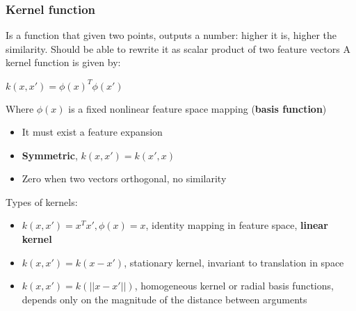 \subsubsection{Kernel function}
    Is a function that given two points, outputs a number: higher it is, higher the similarity. Should be able to rewrite it as scalar product of two feature vectors
    A kernel function is given by:
    \begin{center}
        $k(x,x')=\phi(x)^T\phi(x')$        
    \end{center}
    Where $\phi(x)$ is a fixed nonlinear feature space mapping (\textbf{basis function})
    \begin{itemize}
        \item It must exist a feature expansion
        \item \textbf{Symmetric}, $k(x,x')=k(x',x)$
        \item Zero when two vectors orthogonal, no similarity
    \end{itemize}
    Types of kernels:
    \begin{itemize}
        \item $k(x,x')=x^Tx', \phi(x)=x$, identity mapping in feature space, \textbf{linear kernel}
        \item $k(x,x')=k(x-x')$, stationary kernel, invariant to translation in space
        \item $k(x,x')=k(||x-x'||)$, homogeneous kernel or radial basis functions, depends only on the magnitude of the distance between arguments
    \end{itemize}

